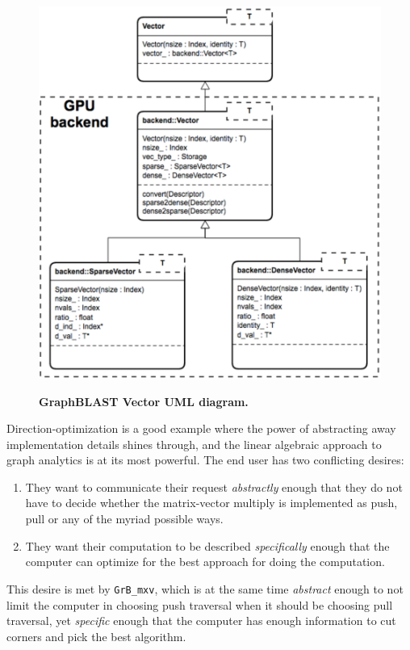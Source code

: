 \begin{figure}[t]
	\includegraphics[width=\linewidth]{fig/graphblast}
	\label{fig:graphblast}
	\caption
	{\textbf{GraphBLAST Vector UML diagram.}}
\end{figure}

Direction-optimization is a good example where the power of abstracting away implementation details shines through, and the linear algebraic approach to graph analytics is at its most powerful. The end user has two conflicting desires:

\begin{enumerate}
	\item They want to communicate their request \emph{abstractly} enough that they do not have to decide whether the matrix-vector multiply is implemented as push, pull or any of the myriad possible ways.
	\item They want their computation to be described \emph{specifically} enough that the computer can optimize for the best approach for doing the computation.
\end{enumerate}

This desire is met by \verb'GrB_mxv', which is at the same time \emph{abstract} enough to not limit the computer in choosing push traversal when it should be choosing pull traversal, yet \emph{specific} enough that the computer has enough information to cut corners and pick the best algorithm.

